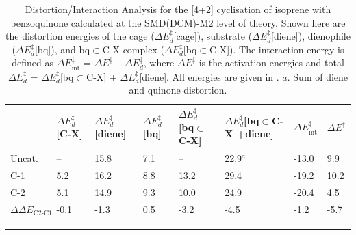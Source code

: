\documentclass[../../main.tex]{subfiles}
\begin{document}
\begin{table}[h!]
	\def\arraystretch{2.0}
	\begin{tabularx}{\textwidth}{YYYYYYYY}
		\hline
		& \small{$\Delta E^\ddagger_d$ [C-X]} &\small{$\Delta E^\ddagger_d$ [diene]}&	\small{$\Delta E^\ddagger_d$ [bq]}&	\small{$\Delta E^\ddagger_d$ [bq$\subset$C-X]} &	\small{$\Delta E^\ddagger_d$[bq$\subset$C-X +diene]} &  \small{$\Delta E^\ddagger_\text{int}$} & \small{$\Delta E^\ddagger$
}\\
		\hline
		Uncat.         	&--	 &   15.8 	&7.1	&--	&22.9${}^a$&	-13.0&	9.9
\\
		C-1	               &5.2	  &  16.2&	8.8	  &13.2&	29.4&	-19.2&	10.2
\\
		C-2               &	5.1	 &   14.9	&9.3&	10.0&	24.9&	-20.4&	4.5
\\
		$\Delta\Delta E_\text{C2-C1}$ &	-0.1	&-1.3&	0.5	&-3.2&	-4.5&	-1.2&	-5.7
\\
	\end{tabularx}
\hrule
\caption{Distortion/Interaction Analysis for the [4+2] cyclisation of isoprene with benzoquinone calculated at the SMD(DCM)-M2 level of theory. Shown here are the distortion energies of the cage ($\Delta E^\ddagger_d$[cage]), substrate ($\Delta E^\ddagger_d$[diene]), dienophile ($\Delta E^\ddagger_d$[bq]), and bq$\subset$C-X complex ($\Delta E^\ddagger_d$[bq$\subset$C-X]). The interaction energy is defined as $\Delta E^\ddagger_\text{int}$ = $\Delta E^\ddagger - \Delta E^\ddagger_d$, where $\Delta E^\ddagger$ is the activation energies and total $\Delta E^\ddagger_d$ = $\Delta E^\ddagger_d$[bq$\subset$C-X] + $\Delta E^\ddagger_d$[diene]. All energies are given in \kcal. $a.$ Sum of diene and quinone distortion.}
\label{table::da1}
\end{table}
\end{document}
